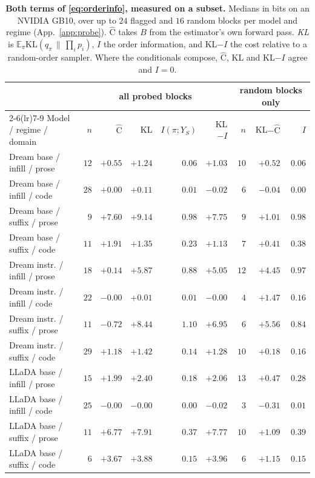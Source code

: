 \begin{table}[!ht]
\centering
\footnotesize
\setlength{\tabcolsep}{4pt}
\begin{tabular}{lrrrrrrrr}
\toprule
 & \multicolumn{5}{c}{all probed blocks} & \multicolumn{3}{c}{random blocks only} \\
\cmidrule(lr){2-6}\cmidrule(lr){7-9}
Model / regime / domain & $n$ & $\widehat{\mathrm{C}}$ & KL & $I(\pi;Y_S)$ & KL$-I$ & $n$ & KL$-\widehat{\mathrm{C}}$ & $I$ \\
\midrule
Dream base / infill / prose & $12$ & $+0.55$ & $+1.24$ & $0.06$ & $+1.03$ & $10$ & $+0.52$ & $0.06$ \\
Dream base / infill / code & $28$ & $+0.00$ & $+0.11$ & $0.01$ & $-0.02$ & $6$ & $-0.04$ & $0.00$ \\
Dream base / suffix / prose & $9$ & $+7.60$ & $+9.14$ & $0.98$ & $+7.75$ & $9$ & $+1.01$ & $0.98$ \\
Dream base / suffix / code & $11$ & $+1.91$ & $+1.35$ & $0.23$ & $+1.13$ & $7$ & $+0.41$ & $0.38$ \\
Dream instr. / infill / prose & $18$ & $+0.14$ & $+5.87$ & $0.88$ & $+5.05$ & $12$ & $+4.45$ & $0.97$ \\
Dream instr. / infill / code & $22$ & $-0.00$ & $+0.01$ & $0.01$ & $-0.00$ & $4$ & $+1.47$ & $0.16$ \\
Dream instr. / suffix / prose & $11$ & $-0.72$ & $+8.44$ & $1.10$ & $+6.95$ & $6$ & $+5.56$ & $0.84$ \\
Dream instr. / suffix / code & $29$ & $+1.18$ & $+1.42$ & $0.14$ & $+1.28$ & $10$ & $+0.18$ & $0.16$ \\
LLaDA base / infill / prose & $15$ & $+1.99$ & $+2.40$ & $0.18$ & $+2.06$ & $13$ & $+0.47$ & $0.28$ \\
LLaDA base / infill / code & $25$ & $-0.00$ & $-0.00$ & $0.00$ & $-0.02$ & $3$ & $-0.31$ & $0.01$ \\
LLaDA base / suffix / prose & $11$ & $+6.77$ & $+7.91$ & $0.37$ & $+7.77$ & $10$ & $+1.09$ & $0.39$ \\
LLaDA base / suffix / code & $6$ & $+3.67$ & $+3.88$ & $0.15$ & $+3.96$ & $6$ & $+1.15$ & $0.15$ \\
\bottomrule
\end{tabular}
\caption{\textbf{Both terms of \eqref{eq:orderinfo}, measured on a subset.} Medians in
bits on an NVIDIA GB10, over up to $24$ flagged and $16$ random blocks per model and
regime (App.~\ref{app:probe}). $\widehat{\mathrm{C}}$ takes $B$ from the estimator's own
forward pass. \emph{KL} is $\mathbb{E}_\pi\mathrm{KL}(q_\pi\,\|\,\prod_i p_i)$, $I$ the
order information, and KL$-I$ the cost relative to a random-order sampler. Where the
conditionals compose, $\widehat{\mathrm{C}}$, KL and KL$-I$ agree and $I=0$.}\label{tab:probe}
\end{table}
